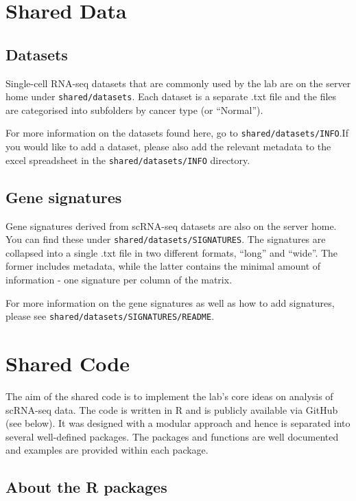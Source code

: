 \documentclass[]{book}
\begin{document}
\chapter{Shared Data}\label{sharedData}

\section{Datasets}\label{datasets}

Single-cell RNA-seq datasets that are commonly used by the lab are on
the server home under \texttt{shared/datasets}. Each dataset is a
separate .txt file and the files are categorised into subfolders by
cancer type (or ``Normal'').

For more information on the datasets found here, go to
\texttt{shared/datasets/INFO}.If you would like to add a dataset, please
also add the relevant metadata to the excel spreadsheet in the
\texttt{shared/datasets/INFO} directory.

\section{Gene signatures}\label{gene-signatures}

Gene signatures derived from scRNA-seq datasets are also on the server
home. You can find these under \texttt{shared/datasets/SIGNATURES}. The
signatures are collapsed into a single .txt file in two different
formats, ``long'' and ``wide''. The former includes metadata, while the
latter contains the minimal amount of information - one signature per
column of the matrix.

For more information on the gene signatures as well as how to add
signatures, please see \texttt{shared/datasets/SIGNATURES/README}.

\chapter{Shared Code}\label{sharedCode}

The aim of the shared code is to implement the lab's core ideas on
analysis of scRNA-seq data. The code is written in R and is publicly
available via GitHub (see below). It was designed with a modular
approach and hence is separated into several well-defined packages. The
packages and functions are well documented and examples are provided
within each package.

\section{About the R packages}\label{about-the-r-packages}
\end{document}
